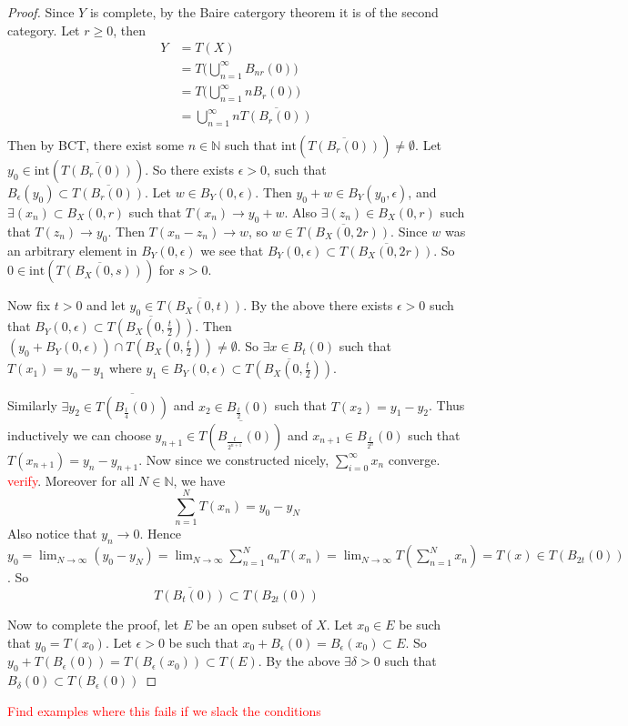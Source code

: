 \begin{proof}
  Since $Y$ is complete, by the Baire catergory theorem it is of the
  second category. Let $r \ge 0$, then
  \begin{align*}Y &= T(X)  \\
    &= T\Big(\bigcup_{n = 1}^{\infty}B_{nr}(0)\Big) \\
    &= T\Big(\bigcup_{n = 1}^{\infty} n B_r(0)\Big) \\
    &= \bigcup_{n = 1}^{\infty} n \overline{T(B_r(0))} \\
  \end{align*}
  Then by BCT, there exist some $ n \in \mathbb{N}$ such that
  $\textrm{int}(\overline{T(B_r(0))}) \neq \emptyset$. Let $y_0 \in
  \textrm{int}(\overline{T(B_r(0))})$. So there exists $\epsilon >
  0$, such that $B_\epsilon(y_0) \subset \overline{T(B_r(0))}$. Let
  $w \in B_Y(0, \epsilon)$. Then $y_0 + w \in B_Y(y_0, \epsilon)$,
  and $\exists (x_n) \subset B_X(0, r)$ such that $T(x_n) \to y_0 +
  w$. Also $\exists(z_n) \in B_X(0, r)$ such that $T(z_n) \to y_0$.
  Then $T(x_n - z_n) \to w$, so $w \in \overline{T(B_{X}(0, 2r))}$.
  Since $w$ was an arbitrary element in $B_{Y}(0, \epsilon)$ we see
  that $B_Y(0, \epsilon) \subset \overline{T(B_X(0, 2r))}$. So $0 \in
  \textrm{int}(\overline{T(B_X(0, s))})$ for $s > 0$.

  Now fix $t > 0$ and let $y_0 \in \overline{T(B_X(0, t))}$. By the
  above there exists $\epsilon > 0$ such that $B_Y(0, \epsilon)
  \subset \overline{T(B_X(0, {\frac{t}{2}}))}$. Then $(y_0 + B_Y(0,
  \epsilon)) \cap T(B_X(0, {\frac{t}{2}}))  \neq \emptyset$. So
  $\exists x \in B_t(0)$ such that $T(x_1) = y_0 - y_1$ where $y_1
  \in B_Y(0, \epsilon) \subset \overline{T(B_X(0, {\frac{t}{2}}))}$.

  Similarly $\exists y_2 \in \overline{T(B_{\frac{t}{4}}(0))}$ and
  $x_2 \in B_{\frac{t}{2}}(0)$ such that $T(x_2) = y_1 - y_2$. Thus
  inductively we can choose $y_{n+1} \in
  \overline{T(B_{\frac{t}{2^{n+1}}}(0))}$ and $x_{n+1} \in
  B_{\frac{t}{2^n}}(0)$ such that $T(x_{n+1}) = y_n - y_{n+1}$. Now
  since we constructed nicely, $\sum_{i = 0}^{\infty}  x_n$ converge.
  \textcolor{red}{verify}.
  Moreover for all $N \in \mathbb{N}$, we have \[
    \sum_{n = 1}^{N} T(x_n) = y_0 - y_N
  \]
  Also notice that $y_n \to 0$. Hence $y_0 = \lim_{N \to \infty} (y_0
  - y_N) = \lim_{N \to \infty} \sum_{n = 1}^{N} a_n T(x_n) = \lim_{N
  \to \infty} T( \sum_{n = 1}^{N} x_n) = T(x) \in T( B_{2t}(0))$. So \[
    \overline{T(B_t(0))} \subset T(B_{2t}(0))
  \]

  Now to complete the proof, let $E$ be an open subset of $X$. Let
  $x_0 \in E$ be such that $y_0 = T(x_0)$. Let $\epsilon > 0$ be such
  that $ x_0 + B_\epsilon(0) = B_\epsilon(x_0) \subset E$. So $y_0 +
  T(B_\epsilon(0)) = T(B_\epsilon(x_0)) \subset T(E)$. By the above
  $\exists \delta > 0$ such that $ B_\delta(0) \subset T(B_\epsilon(0))$
\end{proof}
\textcolor{red}{Find examples where this fails if we slack the conditions}

